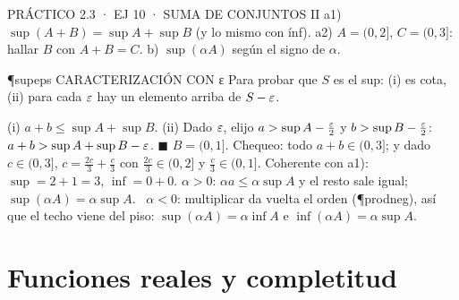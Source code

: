 \begin{enunciado}{PRÁCTICO 2.3 · EJ 10 · SUMA DE CONJUNTOS II}
a1) $\sup(A+B)=\sup A+\sup B$ (y lo mismo con ínf). a2) $A=(0,2]$, $C=(0,3]$: hallar $B$ con $A+B=C$. b) $\sup(\alpha A)$ según el signo de $\alpha$.
\end{enunciado}
\begin{uso}{\P{supeps} CARACTERIZACIÓN CON ε}
Para probar que $S$ es el sup: (i) es cota, (ii) para cada $\varepsilon$ hay un elemento arriba de $S-\varepsilon$.
\end{uso}
(i) $a+b\le\sup A+\sup B$. (ii) Dado $\varepsilon$, elijo $a>\sup A-\frac{\varepsilon}2$ y $b>\sup B-\frac{\varepsilon}2$: $a+b>\sup A+\sup B-\varepsilon$. $\blacksquare$
$B=(0,1]$. Chequeo: todo $a+b\in(0,3]$; y dado $c\in(0,3]$, $c=\frac{2c}3+\frac c3$ con $\frac{2c}3\in(0,2]$ y $\frac c3\in(0,1]$. Coherente con a1): $\sup=2+1=3$, $\inf=0+0$.
$\alpha>0$: $\alpha a\le\alpha\sup A$ y el resto sale igual; $\sup(\alpha A)=\alpha\sup A$. \ $\alpha<0$: multiplicar da vuelta el orden (\P{prodneg}), así que el techo viene del piso: $\sup(\alpha A)=\alpha\inf A$ e $\inf(\alpha A)=\alpha\sup A$.

\section{Funciones reales y completitud}

